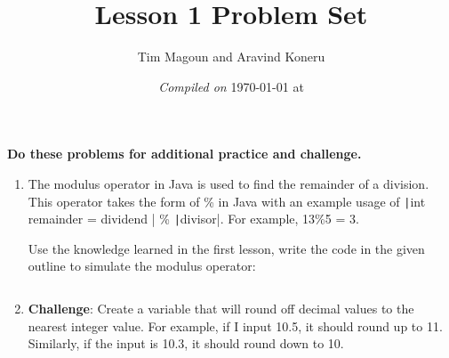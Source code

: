 \documentclass[11pt,fleqn]{article}
\newcommand{\mil}[2][java]{\texttt|#2|}
\begin{document}
\title{Lesson 1 Problem Set}%
\author{Tim Magoun and Aravind Koneru}
\date{\textit{Compiled on} \today \hspace{1mm} at \currenttime}
\maketitle

\begin{center}
\textbf{Do these problems for additional practice and challenge.}
\end{center}

\begin{enumerate}
\item 
The modulus operator in Java is used to find the remainder of a division. This operator takes the
form of \% in Java with an example usage of \mil{int remainder = dividend } \% \mil{divisor}. For example,
13\%5 = 3. 

Use the knowledge learned in the first lesson, write the code in the given outline to simulate the modulus operator:
\inputminted{java}{../src/Modulus.java}

\item
\textbf{Challenge}:
Create a variable that will round off decimal values to the nearest integer value. For example, if I input
10.5, it should round up to 11. Similarly, if the input is 10.3, it should round down to 10. 

\inputminted{java}{../src/Rounder.java}

\end{enumerate}
\end{document}
